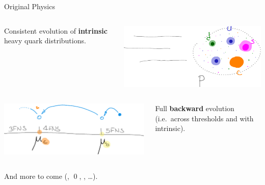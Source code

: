\documentclass[9pt]{beamer}
\begin{document}
\begin{frame}{Original Physics}

    \begin{columns}
        \begin{column}{0.4\textwidth}
            Consistent evolution of \textbf{intrinsic} heavy quark
            distributions.
        \end{column}
        \begin{column}{0.5\textwidth}
            \begin{center}
                \includegraphics[width=0.9\linewidth]{intrinsic}
            \end{center}
        \end{column}
    \end{columns}

    \vspace*{10pt}
    \begin{columns}
        \begin{column}{0.5\textwidth}
            \begin{center}
                \includegraphics[width=0.9\linewidth]{back-vfns}
            \end{center}
        \end{column}
        \begin{column}{0.4\textwidth}
            Full \textbf{backward \vfns{}} evolution (i.e.\ across thresholds
            and with intrinsic).
        \end{column}
    \end{columns}

    \vspace*{35pt}
    And more to come (\mhou, \qed, \nnnlo, \dots).
\end{frame}
\end{document}
